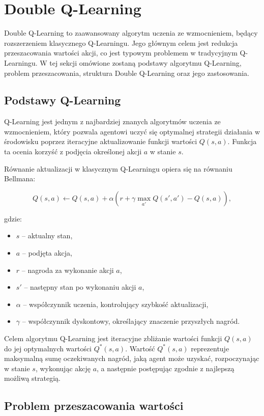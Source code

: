 \section{Double Q-Learning}

Double Q-Learning to zaawansowany algorytm uczenia ze wzmocnieniem, będący rozszerzeniem klasycznego Q-Learningu. Jego głównym celem jest redukcja przeszacowania wartości akcji, co jest typowym problemem w tradycyjnym Q-Learningu. W tej sekcji omówione zostaną podstawy algorytmu Q-Learning, problem przeszacowania, struktura Double Q-Learning oraz jego zastosowania.

\subsection{Podstawy Q-Learning}

Q-Learning jest jednym z najbardziej znanych algorytmów uczenia ze wzmocnieniem, który pozwala agentowi uczyć się optymalnej strategii działania w środowisku poprzez iteracyjne aktualizowanie funkcji wartości \(Q(s, a)\). Funkcja ta ocenia korzyść z podjęcia określonej akcji \(a\) w stanie \(s\).

Równanie aktualizacji w klasycznym Q-Learningu opiera się na równaniu Bellmana:

\[
	Q(s, a) \leftarrow Q(s, a) + \alpha \left( r + \gamma \max_{a'} Q(s', a') - Q(s, a) \right),
\]

gdzie:
\begin{itemize}
	\item \(s\) – aktualny stan,
	\item \(a\) – podjęta akcja,
	\item \(r\) – nagroda za wykonanie akcji \(a\),
	\item \(s'\) – następny stan po wykonaniu akcji \(a\),
	\item \(\alpha\) – współczynnik uczenia, kontrolujący szybkość aktualizacji,
	\item \(\gamma\) – współczynnik dyskontowy, określający znaczenie przyszłych nagród.
\end{itemize}

Celem algorytmu Q-Learning jest iteracyjne zbliżanie wartości funkcji \(Q(s, a)\) do jej optymalnych wartości \(Q^*(s, a)\). Wartość \(Q^*(s, a)\) reprezentuje maksymalną sumę oczekiwanych nagród, jaką agent może uzyskać, rozpoczynając w stanie \(s\), wykonując akcję \(a\), a następnie postępując zgodnie z najlepszą możliwą strategią.

\subsection{Problem przeszacowania wartości}


